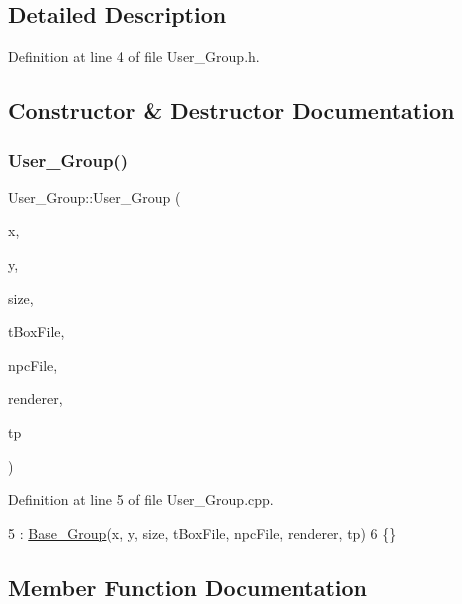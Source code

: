 \subsection{Detailed Description}


Definition at line 4 of file User\+\_\+\+Group.\+h.



\subsection{Constructor \& Destructor Documentation}
\mbox{\label{class_user___group_a553bb5b748ef79772fe5cecedc2154be}} 
\subsubsection{\texorpdfstring{User\+\_\+\+Group()}{User\_Group()}}
{\footnotesize\ttfamily User\+\_\+\+Group\+::\+User\+\_\+\+Group (\begin{DoxyParamCaption}\item[{int}]{x,  }\item[{int}]{y,  }\item[{int}]{size,  }\item[{std\+::string}]{t\+Box\+File,  }\item[{std\+::string}]{npc\+File,  }\item[{S\+D\+L\+\_\+\+Renderer $\ast$}]{renderer,  }\item[{\hyperlink{class_topic}{Topic}}]{tp }\end{DoxyParamCaption})}



Definition at line 5 of file User\+\_\+\+Group.\+cpp.


\begin{DoxyCode}
5                                                                                                            
                : \hyperlink{class_base___group_a96e70ee101d6430696f7b13b07190787}{Base\_Group}(x, y, size, tBoxFile, npcFile, renderer, tp)
6 \{\}
\end{DoxyCode}


\subsection{Member Function Documentation}
\mbox{\label{class_user___group_a40051b822a0f0dd126b95d0f0fd28eff}} 
